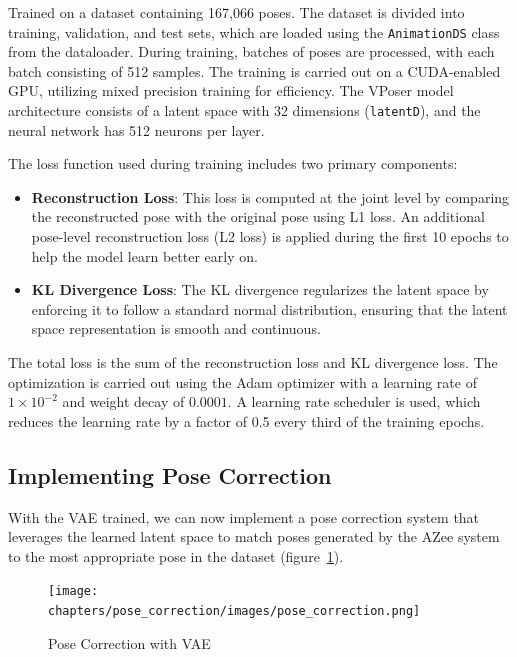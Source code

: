 \documentclass[../../main.tex]{subfiles}
\begin{document}
Trained on a dataset containing 167,066 poses. The dataset is divided into training, validation, and test sets, which are loaded using the \texttt{AnimationDS} class from the dataloader. During training, batches of poses are processed, with each batch consisting of 512 samples. The training is carried out on a CUDA-enabled GPU, utilizing mixed precision training for efficiency. The VPoser model architecture consists of a latent space with 32 dimensions (\texttt{latentD}), and the neural network has 512 neurons per layer. 

The loss function used during training includes two primary components: 
\begin{itemize}
    \item \textbf{Reconstruction Loss}: This loss is computed at the joint level by comparing the reconstructed pose with the original pose using L1 loss. An additional pose-level reconstruction loss (L2 loss) is applied during the first 10 epochs to help the model learn better early on.
    \item \textbf{KL Divergence Loss}: The KL divergence regularizes the latent space by enforcing it to follow a standard normal distribution, ensuring that the latent space representation is smooth and continuous.
\end{itemize}

The total loss is the sum of the reconstruction loss and KL divergence loss. The optimization is carried out using the Adam optimizer with a learning rate of $1 \times 10^{-2}$ and weight decay of $0.0001$. A learning rate scheduler is used, which reduces the learning rate by a factor of 0.5 every third of the training epochs. 

\subsection{Implementing Pose Correction}
\label{ch:pose_correction:pose_correction_with_azee:implementation}

With the VAE trained, we can now implement a pose correction system that leverages the learned latent space to match poses generated by the AZee system to the most appropriate pose in the dataset (figure~\ref{fig:pose_correction}).

\begin{figure}
  \centering \texttt{[image: chapters/pose\_correction/images/pose\_correction.png]}
  \caption{Pose Correction with VAE}
  \label{fig:pose_correction}
\end{figure}
\end{document}
